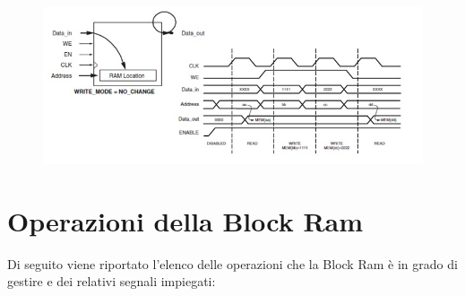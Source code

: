 \begin{itemize}
\begin{figure}[!h]
\centering
\includegraphics[width=\textwidth]{img/blockRam/noChange.jpg}
\label{fig:set_ass}
\end{figure}

\end{itemize}

\section{Operazioni della Block Ram}

Di seguito viene riportato l'elenco delle operazioni che la Block Ram  \`e in grado di gestire e dei relativi segnali impiegati:

